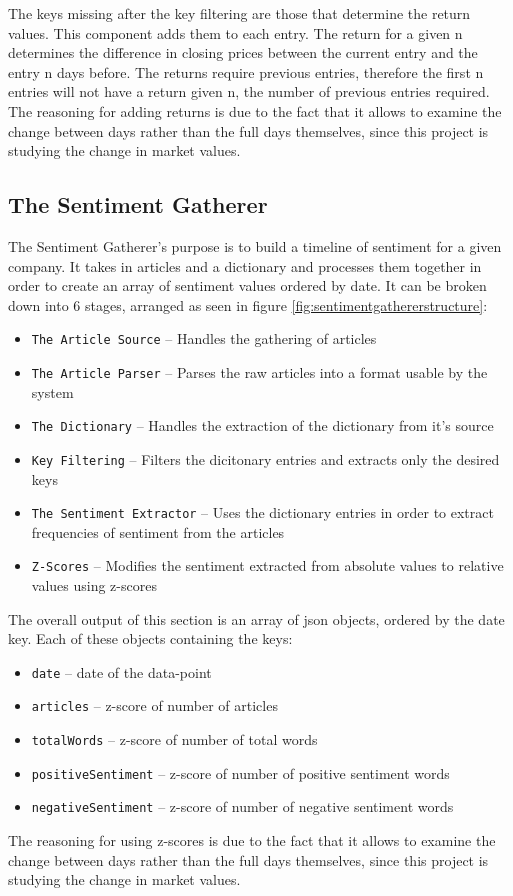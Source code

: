 The keys missing after the key filtering are those that determine the return values. This component adds them to each entry. The return for a given n determines the difference in closing prices between the current entry and the entry n days before. The returns require previous entries, therefore the first n entries will not have a return given n, the number of previous entries required. The reasoning for adding returns is due to the fact that it allows to examine the change between days rather than the full days themselves, since this project is studying the change in market values.

\subsection{The Sentiment Gatherer}

The Sentiment Gatherer's purpose is to build a timeline of sentiment for a given company. It takes in articles and a dictionary and processes them together in order to create an array of sentiment values ordered by date. It can be broken down into 6 stages, arranged as seen in figure \ref{fig:sentimentgathererstructure}:
\begin{itemize}
    \item \texttt{The Article Source} -- Handles the gathering of articles
    \item \texttt{The Article Parser} -- Parses the raw articles into a format usable by the system
    \item \texttt{The Dictionary} -- Handles the extraction of the dictionary from it's source
    \item \texttt{Key Filtering} -- Filters the dicitonary entries and extracts only the desired keys
    \item \texttt{The Sentiment Extractor} -- Uses the dictionary entries in order to extract frequencies of sentiment from the articles
    \item \texttt{Z-Scores} -- Modifies the sentiment extracted from absolute values to relative values using z-scores
\end{itemize}

The overall output of this section is an array of json objects, ordered by the date key. Each of these objects containing the keys:
\begin{itemize}
    \item \texttt{date} -- date of the data-point
    \item \texttt{articles} -- z-score of number of articles
    \item \texttt{totalWords} -- z-score of number of total words
    \item \texttt{positiveSentiment} -- z-score of number of positive sentiment words
    \item \texttt{negativeSentiment} -- z-score of number of negative sentiment words
\end{itemize}
The reasoning for using z-scores is due to the fact that it allows to examine the change between days rather than the full days themselves, since this project is studying the change in market values.

